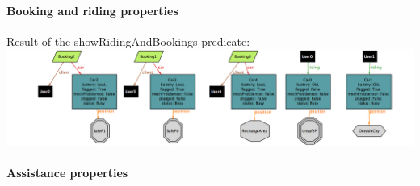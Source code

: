 \documentclass[]{article}
\let\oldparagraph\paragraph
\renewcommand{\paragraph}[1]{\oldparagraph{#1}\mbox{}}
\begin{document}
\newpage

\paragraph{Booking and riding
properties}\label{booking-and-riding-properties}

Result of the showRidingAndBookings predicate:\newline \newline
\includegraphics[width=1.00000\textwidth,height=1.00000\textwidth]{./alloyworlds/showRidingAndBookings.png}

\paragraph{Assistance properties}\label{assistance-properties}
\end{document}
